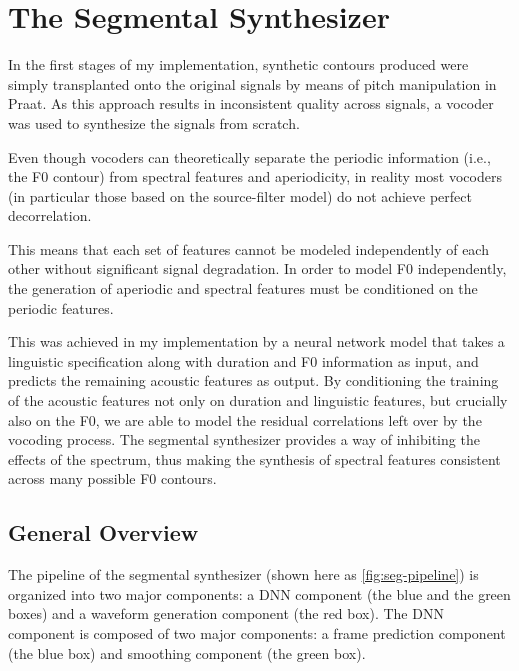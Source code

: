 



\chapter{The Segmental Synthesizer}\label{chap:segmental-synthesizer}

In the first stages of my implementation, synthetic contours produced were simply transplanted onto the original signals by means of pitch manipulation in Praat.
As this approach results in inconsistent quality across signals, a vocoder was used to synthesize the signals from scratch.

Even though vocoders can theoretically separate the periodic information (i.e., the \ac{F0} contour) from spectral features and aperiodicity, in reality most vocoders (in particular those based on the source-filter model) do not achieve perfect decorrelation.

This means that each set of features cannot be modeled independently of each other without significant signal degradation.
In order to model \ac{F0} independently, the generation of aperiodic and spectral features must be conditioned on the periodic features.

This was achieved in my implementation by a neural network model that takes a linguistic specification along with duration and \ac{F0} information as input, and predicts the remaining acoustic features as output.
By conditioning the training of the acoustic features not only on duration and linguistic features, but crucially also on the \ac{F0}, we are able to model the residual correlations left over by the vocoding process.
The segmental synthesizer provides a way of inhibiting the effects of the spectrum, thus making the synthesis of spectral features consistent across many possible \ac{F0} contours.

\vfill

\section{General Overview}

The pipeline of the segmental synthesizer (shown here as \autoref{fig:seg-pipeline}) is organized into two major components: a \ac{DNN} component (the blue and the green boxes) and a waveform generation component (the red box).
The \ac{DNN} component is composed of two major components: a frame prediction component (the blue box) and smoothing component (the green box).

